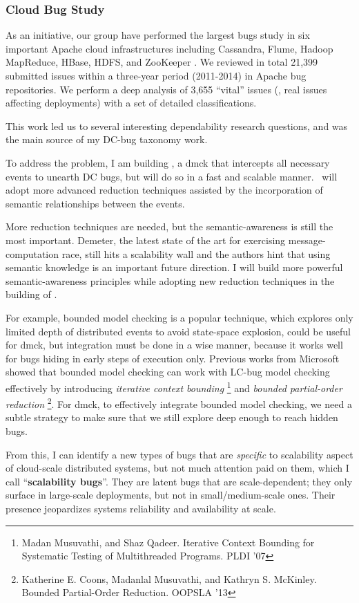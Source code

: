 
\subsubsection{Cloud Bug Study}

As an initiative, our group have performed the largest bugs study in six
important Apache cloud infrastructures including Cassandra, Flume, Hadoop
MapReduce, HBase, HDFS, and ZooKeeper \cite{Gunawi+14-Cbs}. We reviewed in
total 21,399 submitted issues within a three-year period (2011-2014) in Apache
bug repositories. We perform a deep analysis of 3,655 ``vital'' issues (\ie,
real issues affecting deployments) with a set of detailed classifications. 
\fi

This
work led us to several interesting dependability research questions, and was
the main source of my DC-bug taxonomy work.
\fi

To address the problem, I am building \fullcheck, a dmck that intercepts all
necessary events to unearth DC bugs, but will do so in a fast and scalable
manner. \fullcheck\ will adopt more advanced reduction techniques assisted by
the incorporation of semantic relationships between the events. 

More reduction techniques are needed, but the semantic-awareness is still the
most important. Demeter, the latest state of the art for exercising
message-computation race, still hits a scalability wall and the authors hint
that using semantic knowledge is an important future direction. I will build
more powerful semantic-awareness principles while adopting new reduction
techniques in the building of \fullcheck.
\fi

For example, bounded model checking is a popular technique,
which explores only limited depth of distributed events to avoid state-space
explosion, could be useful for dmck, but integration must be done in a wise
manner, because it works well for bugs hiding in early steps of execution only.
Previous works from Microsoft showed that bounded model checking can work with
LC-bug model checking effectively by introducing \textit{iterative context
bounding} \footnote{Madan Musuvathi, and Shaz Qadeer. Iterative Context Bounding
for Systematic Testing of Multithreaded Programs. PLDI '07} and \textit{bounded
partial-order reduction} \footnote{Katherine E. Coons, Madanlal Musuvathi, and
Kathryn S. McKinley. Bounded Partial-Order Reduction. OOPSLA '13}. For dmck, to
effectively integrate bounded model checking, we need a subtle strategy to make
sure that we still explore deep enough to reach hidden bugs.
\fi

From this, I can identify a new types of bugs that are \textit{specific} to
scalability aspect of cloud-scale distributed systems, but not much attention
paid on them, which I call ``\textbf{scalability bugs}''. They are latent bugs
that are scale-dependent; they only surface in large-scale deployments, but not
in small/medium-scale ones. Their presence jeopardizes systems reliability and
availability at scale. 
\fi 

